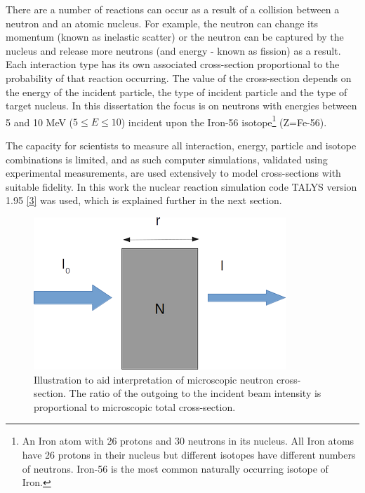 \documentclass[
  12pt,
  a4paper,
  twoside]{book}
\begin{document}
There are a number of reactions can occur as a result of a collision between a neutron and an atomic nucleus. For example, the neutron can change its momentum (known as inelastic scatter) or the neutron can be captured by the nucleus and release more neutrons (and energy - known as fission) as a result. Each interaction type has its own associated cross-section proportional to the probability of that reaction occurring. The value of the cross-section depends on the energy of the incident particle, the type of incident particle and the type of target nucleus. In this dissertation the focus is on neutrons with energies between 5 and 10 MeV (\(5 \le E \le 10\)) incident upon the Iron-56 isotope\footnote{An Iron atom with 26 protons and 30 neutrons in its nucleus. All Iron atoms have 26 protons in their nucleus but different isotopes have different numbers of neutrons. Iron-56 is the most common naturally occurring isotope of Iron.} (Z=Fe-56).

The capacity for scientists to measure all interaction, energy, particle and isotope combinations is limited, and as such computer simulations, validated using experimental measurements, are used extensively to model cross-sections with suitable fidelity. In this work the nuclear reaction simulation code TALYS version 1.95 \protect\hyperlink{ref-talys}{{[}3{]}} was used, which is explained further in the next section.

\begin{figure}[H]
 
 {\centering \includegraphics[width=0.8\linewidth]{figures/xs_cropped} 
 
 }
 
 \caption{Illustration to aid interpretation of microscopic neutron cross-section. The ratio of the outgoing to the incident beam intensity is proportional to microscopic total cross-section.}\label{fig:xs-schematic}
 \end{figure}
\end{document}
